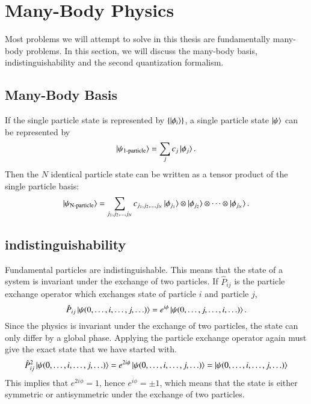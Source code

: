 \section{Many-Body Physics}
\label{sec:many_body_physics}
Most problems we will attempt to solve in this thesis are fundamentally many-body problems.
In this section, we will discuss the many-body basis, indistinguishability and the second quantization formalism.

\subsection{Many-Body Basis}
\label{sub:many_body_basis}
If the single particle state is represented by $ \{ \ket{\phi_i} \} $, a single particle state $ \ket{\psi}  $  can be represented by
\begin{equation}
	\ket{\psi_{\text{1-particle}}}  = \sum_{j} c_j \ket{\phi_{j}}.
\end{equation}
Then the $ N $ identical particle state can be written as a tensor product of the single particle basis:
\begin{equation}
	\label{eq:many_body_state}
	\ket{\psi_{\text{N-particle}}} = \sum_{j_1, j_2, \ldots, j_N} c_{j_1, j_2, \ldots, j_N} \ket{\phi_{j_1}} \otimes \ket{\phi_{j_2}} \otimes \cdots \otimes \ket{\phi_{j_N}}.
\end{equation}

\subsection{indistinguishability}
\label{sub:indistinguishability}
Fundamental particles are indistinguishable. This means that the state of a system is invariant under the exchange of two particles. If $ \hat P_{ij} $ is the particle exchange operator which exchanges state of particle $ i $ and particle $ j $,
\begin{equation}
	\label{eq:indistinguishability}
	\hat P_{ij} \ket{\psi(0,\ldots,i,\ldots,j,\ldots)} = e^{i\phi}\ket{\psi(0,\ldots,j,\ldots,i,\ldots)}. \\
\end{equation}
Since the physics is invariant under the exchange of two particles, the state can only differ by a global phase. Applying the particle exchange operator again must give the exact state that we have started with.
\begin{equation}	
	\hat P_{ij}^2 \ket{\psi(0,\ldots,i,\ldots,j,\ldots)} = e^{2i\phi}\ket{\psi(0,\ldots,i,\ldots,j,\ldots)} = \ket{\psi(0,\ldots,i,\ldots,j,\ldots)} 
\end{equation}
This implies that $ e^{2i\phi} = 1 $, hence $ e^{i\phi} = \pm 1$, which means that the state is either symmetric or antisymmetric under the exchange of two particles. 

